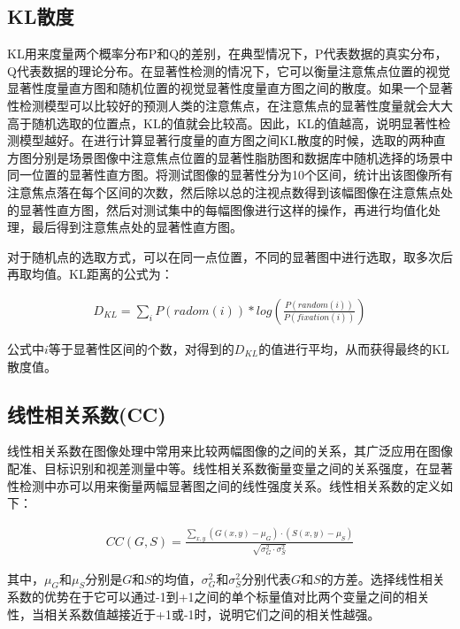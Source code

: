 \subsection{KL散度}
\label{2_5_3}

KL用来度量两个概率分布P和Q的差别，在典型情况下，P代表数据的真实分布，Q代表数据的理论分布。在显著性检测的情况下，它可以衡量注意焦点位置的视觉显著性度量直方图和随机位置的视觉显著性度量直方图之间的散度\cite{Kullback1959book,IttiCVPR2005principled}。如果一个显著性检测模型可以比较好的预测人类的注意焦点，在注意焦点的显著性度量就会大大高于随机选取的位置点，KL的值就会比较高。因此，KL的值越高，说明显著性检测模型越好。在进行计算显著行度量的直方图之间KL散度的时候，选取的两种直方图分别是场景图像中注意焦点位置的显著性脂肪图和数据库中随机选择的场景中同一位置的显著性直方图。将测试图像的显著性分为10个区间，统计出该图像所有注意焦点落在每个区间的次数，然后除以总的注视点数得到该幅图像在注意焦点处的显著性直方图，然后对测试集中的每幅图像进行这样的操作，再进行均值化处理，最后得到注意焦点处的显著性直方图。

对于随机点的选取方式，可以在同一点位置，不同的显著图中进行选取，取多次后再取均值。KL距离的公式为：
\begin{linenomath}
\begin{align}
D_{KL}=\sum_{i}P(radom(i))*log(\frac{P(random(i))}{P(fixation(i))})
\label{式2_42}
\end{align}
\end{linenomath}
公式中$i$等于显著性区间的个数，对得到的$D_{KL}$的值进行平均，从而获得最终的KL散度值。

\subsection{线性相关系数(CC)}
\label{2_5_4}

线性相关系数在图像处理中常用来比较两幅图像的之间的关系，其广泛应用在图像配准、目标识别和视差测量中等。线性相关系数衡量变量之间的关系强度，在显著性检测中亦可以用来衡量两幅显著图之间的线性强度关系\cite{Jost2005Assessing}。线性相关系数的定义如下：
\begin{linenomath}
\begin{align}
CC(G,S)=\frac{\sum_{x,y}(G(x,y)-\mu_{G})\cdot(S(x,y)-\mu_{S})}{\sqrt{\sigma_{G}^{2}\cdot\sigma_{S}^{2}}}
\label{式2_43}
\end{align}
\end{linenomath}
其中，$\mu_{G}$和$\mu_{S}$分别是$G$和$S$的均值，$\sigma_{G}^{2}$和$\sigma_{S}^{2}$分别代表$G$和$S$的方差。选择线性相关系数的优势在于它可以通过-1到+1之间的单个标量值对比两个变量之间的相关性，当相关系数值越接近于+1或-1时，说明它们之间的相关性越强。

